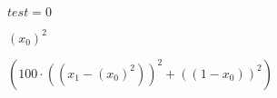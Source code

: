 \documentclass{article}
\begin{document}
\small
\begin{algorithm}
	$test = 0$
\end{algorithm}



\small
\begin{algorithm}[H]
 {${(x_{0})}^2$} 


\end{algorithm}

$(100 \cdot {((x_{1} - {(x_{0})}^2))}^2 + {((1 - x_{0}))}^2)$
 	
\end{document}
